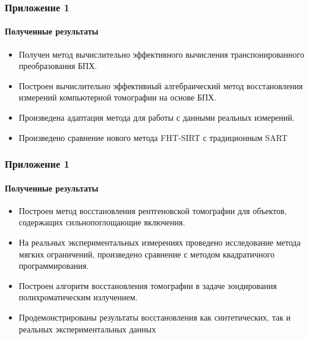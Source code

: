 \documentclass[12pt]{beamer}
\begin{document}
\appendix




\begin{frame}
\frametitle{Приложение 1}
\framesubtitle{Полученные результаты}
\begin{itemize}
  \item Получен метод вычислительно эффективного вычисления транспонированного преобразования БПХ.
  \item Построен вычислительно эффективный алгебраический метод восстановления измерений компьютерной томографии на основе БПХ.
  \item Произведена адаптация метода для работы с данными реальных измерений. \item Произведено сравнение нового метода FHT-SIRT с традиционным SART
\end{itemize}
\end{frame}

\begin{frame}
\frametitle{Приложение 1}
\framesubtitle{Полученные результаты}
\begin{itemize}
  \item Построен метод восстановления рентгеновской томографии для объектов, содержащих сильнопоглощающие включения. 
  \item На реальных экспериментальных измерениях проведено исследование метода мягких ограничений, произведено сравнение с методом квадратичного программирования.
  \item Построен алгоритм восстановления томографии в задаче зондирования полихроматическим излучением. 
  \item Продемонстрированы результаты восстановления как синтетических, так и реальных экспериментальных данных
\end{itemize}
\end{frame}
\end{document}
